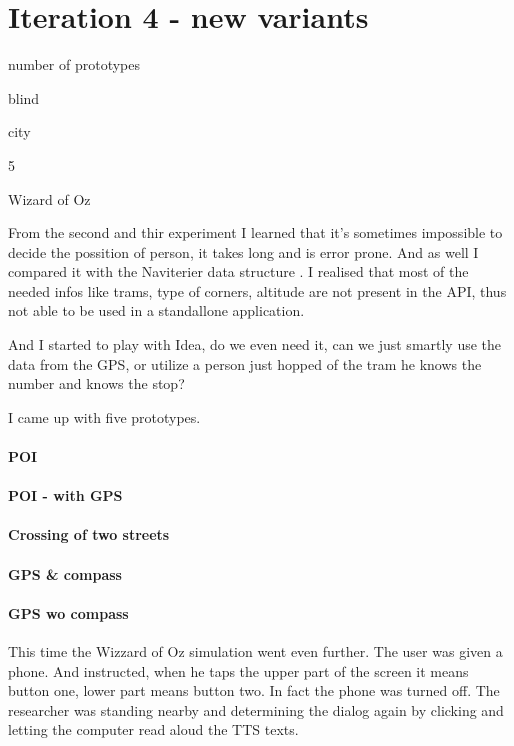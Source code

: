 	\section{Iteration 4 - new variants}
	\begin{labeling}{number of prototypes}
		\item [people] blind
		\item [environment] city
		\item [number of prototypes] 5
		\item [implementation] Wizard of Oz
	\end{labeling}
	From the second and thir experiment I learned that it's sometimes impossible to decide the possition of person, it takes long and is error prone. And as well I compared it with the Naviterier data structure \cite{naviterier-data}. 
	I realised that most of the needed infos like trams, type of corners, altitude are not present in the API, thus not able to be used in a standallone application.
	
	And I started to play with Idea, do we even need it, can we just smartly use the data from the GPS, or utilize a person just hopped of the tram he knows the number and knows the stop?
	
	I came up with five prototypes. 
	
	\paragraph{POI}
	\paragraph{POI - with GPS}
	\paragraph{Crossing of two streets}
	\paragraph{GPS \& compass}
	\paragraph{GPS wo compass}
	
	
	This time the Wizzard of Oz simulation went even further. The user was given a phone. And instructed, when he taps the upper part of the screen it means button one, lower part means button two. In fact the phone was turned off. The researcher was standing nearby and determining the dialog again by clicking and letting the computer read aloud the TTS texts.
	
